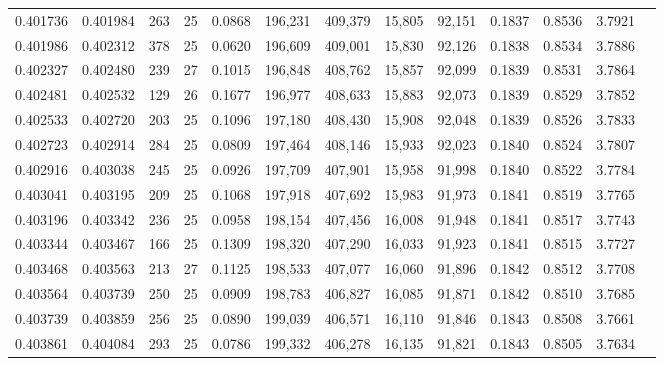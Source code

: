 \begin{tabular}{rrrrrrrrrrrrr}
0.401736 & 0.401984 & 263 &  25 &                                     0.0868 & 196,231 & 409,379 &  15,805 &  92,151 & 0.1837 & 0.8536 & 3.7921 \\
0.401986 & 0.402312 & 378 &  25 &                                     0.0620 & 196,609 & 409,001 &  15,830 &  92,126 & 0.1838 & 0.8534 & 3.7886 \\
0.402327 & 0.402480 & 239 &  27 &                                     0.1015 & 196,848 & 408,762 &  15,857 &  92,099 & 0.1839 & 0.8531 & 3.7864 \\
0.402481 & 0.402532 & 129 &  26 &                                     0.1677 & 196,977 & 408,633 &  15,883 &  92,073 & 0.1839 & 0.8529 & 3.7852 \\
0.402533 & 0.402720 & 203 &  25 &                                     0.1096 & 197,180 & 408,430 &  15,908 &  92,048 & 0.1839 & 0.8526 & 3.7833 \\
0.402723 & 0.402914 & 284 &  25 &                                     0.0809 & 197,464 & 408,146 &  15,933 &  92,023 & 0.1840 & 0.8524 & 3.7807 \\
0.402916 & 0.403038 & 245 &  25 &                                     0.0926 & 197,709 & 407,901 &  15,958 &  91,998 & 0.1840 & 0.8522 & 3.7784 \\
0.403041 & 0.403195 & 209 &  25 &                                     0.1068 & 197,918 & 407,692 &  15,983 &  91,973 & 0.1841 & 0.8519 & 3.7765 \\
0.403196 & 0.403342 & 236 &  25 &                                     0.0958 & 198,154 & 407,456 &  16,008 &  91,948 & 0.1841 & 0.8517 & 3.7743 \\
0.403344 & 0.403467 & 166 &  25 &                                     0.1309 & 198,320 & 407,290 &  16,033 &  91,923 & 0.1841 & 0.8515 & 3.7727 \\
0.403468 & 0.403563 & 213 &  27 &                                     0.1125 & 198,533 & 407,077 &  16,060 &  91,896 & 0.1842 & 0.8512 & 3.7708 \\
0.403564 & 0.403739 & 250 &  25 &                                     0.0909 & 198,783 & 406,827 &  16,085 &  91,871 & 0.1842 & 0.8510 & 3.7685 \\
0.403739 & 0.403859 & 256 &  25 &                                     0.0890 & 199,039 & 406,571 &  16,110 &  91,846 & 0.1843 & 0.8508 & 3.7661 \\
0.403861 & 0.404084 & 293 &  25 &                                     0.0786 & 199,332 & 406,278 &  16,135 &  91,821 & 0.1843 & 0.8505 & 3.7634 \\

\end{tabular}
